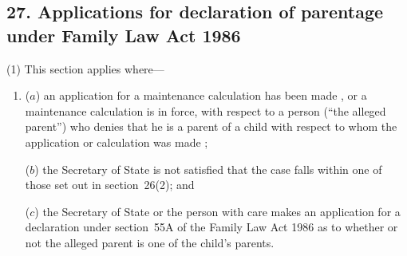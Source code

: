 \documentclass[12pt,a4paper]{article}
\begin{document}
%
%
%
%
%
%

\subsection{27. Applications for declaration of parentage under Family Law Act 1986}

(1) This section applies where—
\begin{enumerate}\item[]
($a$) an application for a maintenance calculation has been made%
, or a maintenance calculation is in force, with respect to a person (“the alleged parent”) who denies that he is a parent of a child with respect to whom the application or calculation was made%
;

($b$) the 
Secretary of State  %
is not satisfied that the case falls within one of those set out in section~26(2); and

($c$) the 
Secretary of State  %
or the person with care makes an application for a declaration under section~55A of the Family Law Act 1986 as to whether or not the alleged parent is one of the child’s parents.
\end{enumerate}
\end{document}
